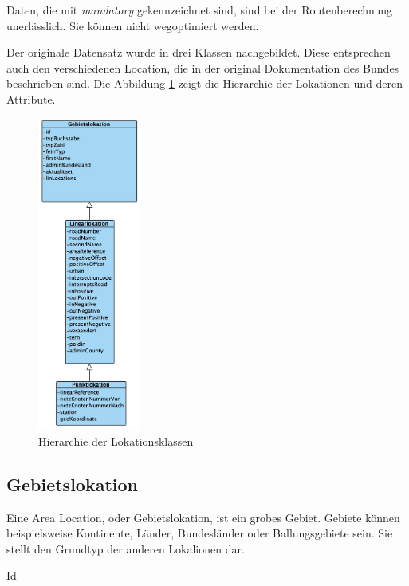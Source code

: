 \documentclass[12pt, a4paper, ngerman]{article}
\begin{document}
Daten, die mit \textit{mandatory} gekennzeichnet sind, sind bei der Routenberechnung unerlässlich. Sie können nicht wegoptimiert werden.

Der originale Datensatz wurde in drei Klassen nachgebildet. Diese entsprechen auch den verschiedenen Location, die in der original Dokumentation des Bundes beschrieben sind.
Die Abbildung \ref{fig:klassendiagrammLokations} zeigt die Hierarchie der Lokationen und deren Attribute.

\begin{figure}[htbp] 
  \centering
     \includegraphics[width=0.3\textwidth]{Grafiken/klassenDiagrammLokations.jpg}
  \caption{Hierarchie der Lokationsklassen}
  \label{fig:klassendiagrammLokations}
\end{figure}

\subsection{Gebietslokation \label{AreaLocation}}
Eine Area Location, oder Gebietslokation, ist ein grobes Gebiet. Gebiete können beispielsweise Kontinente, Länder, Bundesländer oder Ballungsgebiete sein. Sie stellt den Grundtyp der anderen Lokalionen dar.

\begin{attribut}{Id}
\end{attribut}
\end{document}
